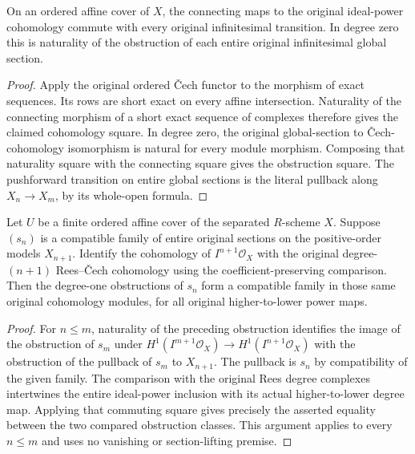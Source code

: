 \begin{lemma}
\label{lem:fc-infinitesimal-boundary-transitions}
\leanok
{}
On an ordered affine cover of $X$, the connecting maps to the original
ideal-power cohomology commute with every original infinitesimal
transition.  In degree zero this is naturality of the obstruction of
each entire original infinitesimal global section.
\end{lemma}
\begin{proof}
Apply the original ordered Čech functor to the morphism of exact
sequences.  Its rows are short exact on every affine intersection.
Naturality of the connecting morphism of a short exact sequence of
complexes therefore gives the claimed cohomology square.  In degree
zero, the original global-section to Čech-cohomology isomorphism is
natural for every module morphism.  Composing that naturality square
with the connecting square gives the obstruction square.  The
pushforward transition on entire global sections is the literal
pullback along $X_n\to X_m$, by its whole-open formula.
\end{proof}


\begin{lemma}
\label{lem:fc-infinitesimal-compatible-section-boundary}
\leanok
{}
Let $U$ be a finite ordered affine cover of the separated $R$-scheme
$X$.  Suppose $(s_n)$ is a compatible family of entire original
sections on the positive-order models $X_{n+1}$.  Identify the
cohomology of $I^{n+1}\mathcal O_X$ with the original degree-$(n+1)$
Rees--\v Cech cohomology using the coefficient-preserving comparison.
Then the degree-one obstructions of $s_n$ form a compatible family in
those same original cohomology modules, for all original
higher-to-lower power maps.
\end{lemma}
\begin{proof}
For $n\leq m$, naturality of the preceding obstruction identifies the
image of the obstruction of $s_m$ under
$H^1(I^{m+1}\mathcal O_X)\to H^1(I^{n+1}\mathcal O_X)$ with the
obstruction of the pullback of $s_m$ to $X_{n+1}$.  The pullback is
$s_n$ by compatibility of the given family.  The comparison with the
original Rees degree complexes intertwines the entire ideal-power
inclusion with its actual higher-to-lower degree map.  Applying that
commuting square gives precisely the asserted equality between the
two compared obstruction classes.  This argument applies to every
$n\leq m$ and uses no vanishing or section-lifting premise.
\end{proof}
